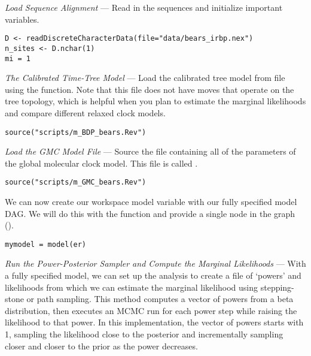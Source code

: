 \textit{Load Sequence Alignment} --- Read in the sequences and initialize important variables.
{\tt \begin{snugshade*}
\begin{lstlisting}
D <- readDiscreteCharacterData(file="data/bears_irbp.nex")
n_sites <- D.nchar(1)
mi = 1
\end{lstlisting}
\end{snugshade*}}

\textit{The Calibrated Time-Tree Model} --- Load the calibrated tree model from file using the  function. Note that this file does not have moves that operate on the tree topology, which is helpful when you plan to estimate the marginal likelihoods and compare different relaxed clock models.
{\tt \begin{snugshade*}
\begin{lstlisting}
source("scripts/m_BDP_bears.Rev")
\end{lstlisting}
\end{snugshade*}}

\textit{Load the GMC Model File} --- Source the file containing all of the parameters of the global molecular clock model. This file is called {\textcolor{red}{}}.

{\tt \begin{snugshade*}
\begin{lstlisting}
source("scripts/m_GMC_bears.Rev")
\end{lstlisting}
\end{snugshade*}}

We can now create our workspace model variable with our fully specified model DAG. 
We will do this with the  function and provide a single node in the graph ().
{\tt \begin{snugshade*}
\begin{lstlisting}
mymodel = model(er)
\end{lstlisting}
\end{snugshade*}}

\textit{Run the Power-Posterior Sampler and Compute the Marginal Likelihoods} --- With a fully specified model, we can set up the  analysis to create a file of `powers' and likelihoods from which we can estimate the marginal likelihood using stepping-stone or path sampling. 
This method computes a vector of powers from a beta distribution, then executes an MCMC run for each power step while raising the likelihood to that power. In this implementation, the vector of powers starts with 1, sampling the likelihood close to the posterior and incrementally sampling closer and closer to the prior as the power decreases. 

